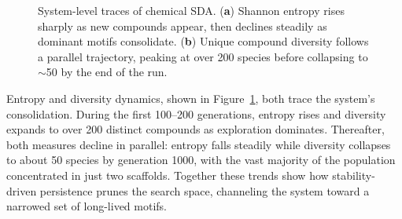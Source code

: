 \documentclass[life,article,submit,pdftex,moreauthors]{Definitions/mdpi}
\begin{document}
\begin{figure}[H]
\centering
{}
\hfill
{}
\caption{System-level traces of chemical SDA. (\textbf{a}) Shannon entropy rises sharply as new compounds appear, then declines steadily as dominant motifs consolidate. (\textbf{b}) Unique compound diversity follows a parallel trajectory, peaking at over 200 species before collapsing to $\sim$50 by the end of the run.}
\label{fig:chem-entropy-diversity}
\end{figure}

Entropy and diversity dynamics, shown in Figure~\ref{fig:chem-entropy-diversity}, both trace the system’s consolidation. During the first 100–200 generations, entropy rises and diversity expands to over 200 distinct compounds as exploration dominates. Thereafter, both measures decline in parallel: entropy falls steadily while diversity collapses to about 50 species by generation 1000, with the vast majority of the population concentrated in just two scaffolds. Together these trends show how stability-driven persistence prunes the search space, channeling the system toward a narrowed set of long-lived motifs.
\end{document}
